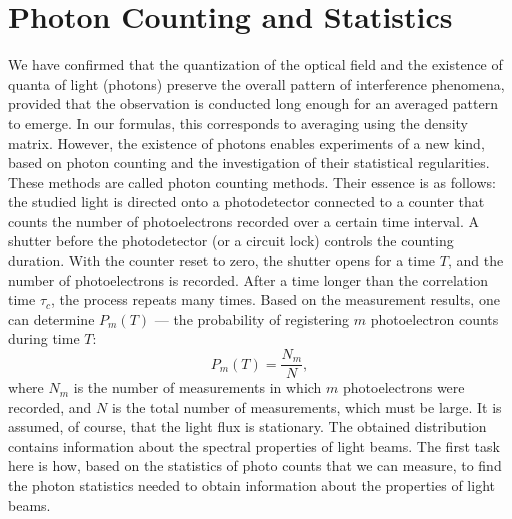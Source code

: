 \section{Photon Counting and Statistics}
We have confirmed that the quantization of the optical field and the existence of quanta of light (photons) preserve the overall pattern of interference phenomena, provided that the observation is conducted long enough for an averaged pattern to emerge. In our formulas, this corresponds to averaging using the density matrix. However, the existence of photons enables experiments of a new kind, based on photon counting and the investigation of their statistical regularities. These methods are called photon counting methods. Their essence is as follows: the studied light is directed onto a photodetector connected to a counter that counts the number of photoelectrons recorded over a certain time interval. A shutter before the photodetector (or a circuit lock) controls the counting duration. With the counter reset to zero, the shutter opens for a time $T$, and the number of photoelectrons is recorded. After a time longer than the correlation time $\tau_c$, the process repeats many times. Based on the measurement results, one can determine $P_m\left(T\right)$ — the probability of registering $m$ photoelectron counts during time $T$: 
\begin{equation}
P_m\left(T\right) = \frac{N_m}{N},
\label{eqCh4_40}
\end{equation}
where $N_m$ is the number of measurements in which $m$ photoelectrons were recorded, and $N$ is the total number of measurements, which must be large. It is assumed, of course, that the light flux is stationary. The obtained distribution contains information about the spectral properties of light beams. The first task here is how, based on the statistics of photo counts that we can measure, to find the photon statistics needed to obtain information about the properties of light beams.  
